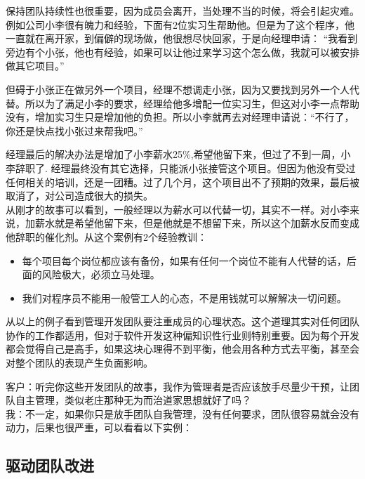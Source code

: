 保持团队持续性也很重要，因为成员会离开，当处理不当的时候，将会引起灾难。\\
例如公司小李很有魄力和经验，下面有2位实习生帮助他。但是为了这个程序，他一直就在离开家，到偏僻的现场做，他很想尽快回家，于是向经理申请：
``我看到旁边有个小张，他也有经验，如果可以让他过来学习这个怎么做，我就可以被安排做其它项目。''

但碍于小张正在做另外一个项目，经理不想调走小张，因为又要找到另外一个人代替。所以为了满足小李的要求，经理给他多增配一位实习生，但这对小李一点帮助没有，增加实习生只是增加他的负担。所以小李就再去对经理申请说：``不行了，你还是快点找小张过来帮我吧。''

经理最后的解决办法是增加了小李薪水25\%,希望他留下来，但过了不到一周，小李辞职了.
经理最终没有其它选择，只能派小张接管这个项目。但因为他没有受过任何相关的培训，还是一团糟。过了几个月，这个项目出不了预期的效果，最后被取消了，对公司造成很大的损失。\\
从刚才的故事可以看到，一般经理以为薪水可以代替一切，其实不一样。对小李来说，加薪水就是希望他留下来，但是他就是不想留下来，所以这个加薪水反而变成他辞职的催化剂。从这个案例有2个经验教训：

\begin{itemize}
\tightlist
\item
  每个项目每个岗位都应该有备份，如果有任何一个岗位不能有人代替的话，后面的风险极大，必须立马处理。
\item
  我们对程序员不能用一般管工人的心态，不是用钱就可以解解决一切问题。\\
\end{itemize}

从以上的例子看到管理开发团队要注重成员的心理状态。这个道理其实对任何团队协作的工作都适用，但对于软件开发这种偏知识性行业则特别重要。因为每个开发都会觉得自己是高手，如果这块心理得不到平衡，他会用各种方式去平衡，甚至会对整个团队的表现产生负面影响。

客户：听完你这些开发团队的故事，我作为管理者是否应该放手尽量少干预，让团队自主管理，类似老庄那种无为而治道家思想就好了吗？\\
我：不一定，如果你只是放手团队自我管理，没有任何要求，团队很容易就会没有动力，后果也很严重，可以看看以下实例：\\

\hypertarget{ux9a71ux52a8ux56e2ux961fux6539ux8fdb}{%
\subsection{驱动团队改进}\label{ux9a71ux52a8ux56e2ux961fux6539ux8fdb}}

